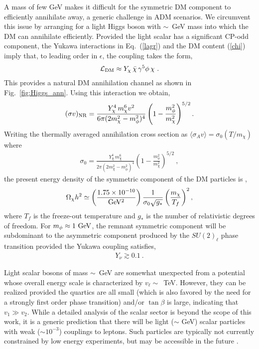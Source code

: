 \documentclass[prd,showpcs,amsmath,amssymb,nofootinbib,preprintnumbers,balancelastpage,longbibliography,superscriptaddress,notitlepage]{revtex4}
\def\bea{\begin{eqnarray}}
\def\eea{\end{eqnarray}}
\def\bea{\begin{eqnarray}}
\def\eea{\end{eqnarray}}
\begin{document}
A mass of few GeV makes it difficult for the symmetric DM component to efficiently annihilate away, a generic challenge in ADM scenarios. 
We circumvent this issue by arranging for a light Higgs boson with $\sim$~GeV mass into which the DM can annihilate efficiently.
Provided the light scalar has a significant CP-odd component,
the Yukawa interactions in Eq.~(\ref{lagr}) and the DM content (\ref{chi}) imply that, to leading order in $\epsilon$, the coupling takes the form,
\bea
\mathcal{L}_{\rm DM} \approx Y_{\chi} \, \bar{\chi}\, \gamma^5 \phi \,\chi \ .
\eea
This provides a natural DM annihilation channel as shown in Fig.~\ref{fig:Higgs_ann}.
Using this interaction we obtain,
\bea
(\sigma v)_{\rm NR}  =  \frac{Y_\chi^4 \,m_\chi^6 v^2}{6\pi(2m_\chi^2-m_\phi^2)^4}\left(1-\frac{m_\phi^2}{m_\chi^2}\right)^{5/2}  .
\eea
Writing the thermally averaged annihilation cross section as
$
\langle\sigma_{\!A} v\rangle =    \sigma_0 \left({T}/{m_\chi}\right)
$
where
\bea
\sigma_0 =  \frac{Y_\chi^4 \,m_\chi^6}{2\pi(2m_\chi^2-m_\phi^2)^4}\left(1-\frac{m_\phi^2}{m_\chi^2}\right)^{5/2} \ ,
\eea
the present energy density of the symmetric component of the DM particles is \cite{Kolb:1990vq,Griest:1990kh},
\bea
\Omega_{\chi} h^2 \simeq\left( \frac{1.75\times 10^{-10}}{{\rm GeV^2}}\right) \frac{1}{\sigma_0  \sqrt{g_*}} \left(\frac{m_\chi}{T_f} \right)^2,
\label{ann2}
\eea
where $T_f$ is the freeze-out temperature and $g_*$ is the number of relativistic degrees of freedom. 
For $m_\phi \approx 1 {\rm \ GeV}$, the remnant symmetric component will be subdominant to the asymmetric component produced by the
$SU(2)_\ell$ phase transition provided the Yukawa coupling satisfies,
\bea
{Y}_{\nu}\gtrsim 0.1  \ .
\label{relationg}
\eea

Light scalar bosons of mass $\sim$~GeV are somewhat unexpected from a potential whose overall energy scale is characterized by $v_\ell \sim$~TeV.
However, they can be realized provided the quartics are all small (which is also favored by the need for a strongly first order phase transition) and/or
$\tan \beta$ is large, indicating that $v_1 \gg v_2$.  While a detailed analysis of the scalar sector is beyond the scope of this work, it is a generic prediction
that there will be light ($\sim$ GeV) scalar particles with weak ($\sim 10^{-3}$) couplings to leptons.  Such particles are typically not currently constrained by
low energy experiments, but may be accessible in the future \cite{Krnjaic:2015mbs}.
\end{document}
